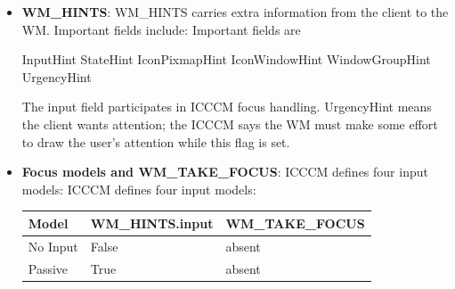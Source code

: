 \documentclass{report}
\begin{document}
\begin{itemize}
            \bigbreak \noindent 
            Important fields are 
            \bigbreak \noindent 
            \begin{cppcode}
                PMinSize      // min_width, min_height
                PMaxSize      // max_width, max_height
                PBaseSize     // base_width, base_height
                PResizeInc    // width_inc, height_inc
                PAspect       // min_aspect, max_aspect
                PWinGravity   // win_gravity
                USPosition    // user-specified position
                USSize        // user-specified size
                PPosition     // program-specified position
                PSize         // program-specified size
            \end{cppcode}
            \bigbreak \noindent 
            For tiling, the big one is PResizeInc. Terminals often want sizes in character-cell increments. If you ignore increments, terminals still work, but you may get ugly unused padding. A simple first WM can ignore this; a better WM applies increments after computing the tile rectangle.
        \item \textbf{WM\_HINTS}: WM\_HINTS carries extra information from the client to the WM. Important fields include:
            \bigbreak \noindent 
            Important fields are
            \bigbreak \noindent 
            \begin{cppcode}
                InputHint
                StateHint
                IconPixmapHint
                IconWindowHint
                WindowGroupHint
                UrgencyHint
            \end{cppcode}
            \bigbreak \noindent 
            The input field participates in ICCCM focus handling. UrgencyHint means the client wants attention; the ICCCM says the WM must make some effort to draw the user’s attention while this flag is set.
        \item \textbf{Focus models and WM\_TAKE\_FOCUS}: ICCCM defines four input models:
            \bigbreak \noindent 
            ICCCM defines four input models:
            \begin{center}
                \begin{tabularx}{\textwidth}{@{}Xll@{}}
                    \toprule
                    \textbf{Model}&	\textbf{WM\_HINTS.input}&	\textbf{WM\_TAKE\_FOCUS} \\
                    \midrule
                    No Input&	False	&absent\\[2ex]
                    Passive	&True	&absent\\[2ex]

\end{tabularx}
\end{center}
\end{itemize}
\end{document}
